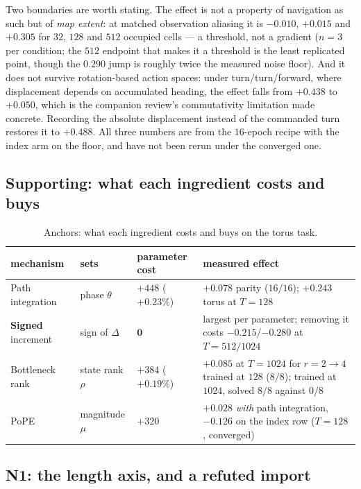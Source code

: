 \documentclass[11pt]{article}
\begin{document}
Two boundaries are worth stating. The effect is not a property of navigation as such
but of \emph{map extent}: at matched observation aliasing it is $-0.010$, $+0.015$ and
$+0.305$ for $32$, $128$ and $512$ occupied cells --- a threshold, not a gradient
($n=3$ per condition; the $512$ endpoint that makes it a threshold is the least
replicated point, though the $0.290$ jump is roughly twice the measured noise floor). And
it does not survive rotation-based action spaces: under turn/turn/forward, where
displacement depends on accumulated heading, the effect falls from $+0.438$ to $+0.050$,
which is the companion review's commutativity limitation made concrete. Recording the
absolute displacement instead of the commanded turn restores it to $+0.488$. All three
numbers are from the $16$-epoch recipe with the index arm on the floor, and have not
been rerun under the converged one.

\subsection{Supporting: what each ingredient costs and buys}
\label{sec:anchors}

\begin{table}[htbp]\centering\small
\caption{Anchors: what each ingredient costs and buys on the torus task.}
\label{tab:anchors}
\begin{tabular}{p{2.4cm}p{1.9cm}p{2.6cm}p{6.4cm}}
\toprule
mechanism & sets & parameter cost & measured effect \\
\midrule
Path integration & phase $\theta$ & $+448$ ($+0.23\%$) & $+0.078$ parity ($16/16$); $+0.243$ torus at $T{=}128$ \\[2pt]
\textbf{Signed} increment & sign of $\Delta$ & $\mathbf{0}$ & largest per parameter; removing it costs $-0.215$/$-0.280$ at $T{=}512/1024$ \\[2pt]
Bottleneck rank & state rank $\rho$ & $+384$ ($+0.19\%$) & $+0.085$ at $T{=}1024$ for $r{=}2\to4$ trained at $128$ ($8/8$); trained at $1024$, solved $8/8$ against $0/8$ \\[2pt]
PoPE & magnitude $\mu$ & $+320$ & $+0.028$ \emph{with} path integration, $-0.126$ on the index row ($T{=}128$, converged) \\[2pt]
\bottomrule
\end{tabular}
\end{table}
\subsection{N1: the length axis, and a refuted import}
\label{sec:localisation}
\end{document}
